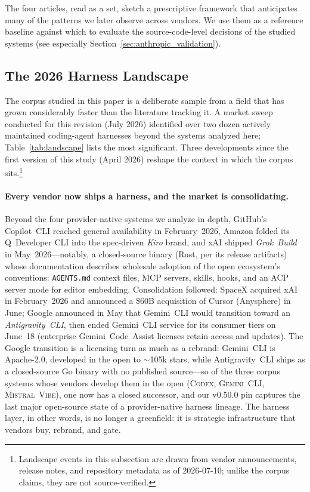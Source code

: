\documentclass[11pt,a4paper]{article}
\newcommand{\cdx}{\textsc{Codex}\xspace}
\newcommand{\vibe}{\textsc{Mistral~Vibe}\xspace}
\newcommand{\gemini}{\textsc{Gemini~CLI}\xspace}
\begin{document}
The four articles, read as a set, sketch a prescriptive framework that anticipates many of the patterns we later observe across vendors.
We use them as a reference baseline against which to evaluate the source-code-level decisions of the studied systems (see especially Section~\ref{sec:anthropic_validation}).

\subsection{The 2026 Harness Landscape}
\label{sec:landscape}

The corpus studied in this paper is a deliberate sample from a field that has grown considerably faster than the literature tracking it.
A market sweep conducted for this revision (July 2026) identified over two dozen actively maintained coding-agent harnesses beyond the systems analyzed here; Table~\ref{tab:landscape} lists the most significant.
Three developments since the first version of this study (April 2026) reshape the context in which the corpus sits.\footnote{Landscape events in this subsection are drawn from vendor announcements, release notes, and repository metadata as of 2026-07-10; unlike the corpus claims, they are not source-verified.}

\paragraph{Every vendor now ships a harness, and the market is consolidating.}
Beyond the four provider-native systems we analyze in depth, GitHub's Copilot~CLI reached general availability in February~2026, Amazon folded its Q~Developer CLI into the spec-driven \emph{Kiro} brand, and xAI shipped \emph{Grok~Build}~\cite{grokbuild2026} in May~2026---notably, a closed-source binary (Rust, per its release artifacts) whose documentation describes wholesale adoption of the open ecosystem's conventions: \texttt{AGENTS.md} context files, MCP servers, skills, hooks, and an ACP server mode for editor embedding.
Consolidation followed: SpaceX acquired xAI in February~2026 and announced a \$60B acquisition of Cursor (Anysphere) in June; Google announced in May that Gemini~CLI would transition toward an \emph{Antigravity~CLI}, then ended Gemini~CLI service for its consumer tiers on June~18 (enterprise Gemini~Code~Assist licenses retain access and updates).
The Google transition is a licensing turn as much as a rebrand: Gemini~CLI is Apache-2.0, developed in the open to ${\sim}$105k stars, while Antigravity~CLI ships as a closed-source Go binary with no published source---so of the three corpus systems whose vendors develop them in the open (\cdx{}, \gemini{}, \vibe{}), one now has a closed successor, and our v0.50.0 pin captures the last major open-source state of a provider-native harness lineage.
The harness layer, in other words, is no longer a greenfield: it is strategic infrastructure that vendors buy, rebrand, and gate.
\end{document}
